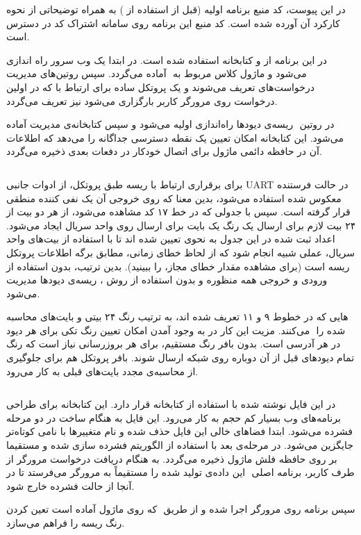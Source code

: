 
در این پیوست، کد منبع برنامه اولیه (قبل از استفاده از ) به همراه توضیحاتی از نحوه کارکرد آن آورده شده است. کد منبع این برنامه روی سامانه اشتراک کد  در دسترس است.


در این برنامه از  و کتابخانه  استفاده شده است. در ابتدا یک وب سرور راه اندازی می‌شود و ماژول کلاس مربوط به ‌ آماده می‌گردد. سپس روتین‌های مدیریت درخواست‌های  تعریف می‌شوند و یک پروتکل ساده برای ارتباط با  که در اولین درخواست روی مرورگر کاربر بارگزاری می‌شود نیز تعریف می‌گردد.

در روتین ‌ ریسه‌ی دیودها راه‌اندازی اولیه می‌شود و سپس کتابخانه‌ی مدیریت  آماده می‌شود. این کتابخانه امکان تعیین یک نقطه دسترسی جداگانه را می‌دهد که اطلاعات آن در حافظه دائمی ماژول برای اتصال خودکار در دفعات بعدی ذخیره می‌گردد.

\inputminted{C++}{espws2811/src/main.cpp}


برای برقراری ارتباط با ریسه طبق پروتکل، از ادوات جانبی UART در حالت فرستنده معکوس شده استفاده می‌شود، بدین معنا که روی خروجی آن یک نفی کننده منطقی قرار گرفته است. سپس با جدولی که در خط ۱۷ کد مشاهده می‌شود، از هر دو بیت از ۲۴ بیت لازم برای ارسال یک رنگ یک بایت برای ارسال روی واحد سریال ایجاد می‌شود. اعداد ثبت شده در این جدول به نحوی تعیین شده اند تا با استفاده از بیت‌های واحد سریال، عملی شبیه  انجام شود که از لحاظ خطای زمانی، مطابق برگه اطلاعات پروتکل ریسه است (برای مشاهده مقدار خطای مجاز،  را ببینید). بدین ترتیب، بدون استفاده از ورودی و خروجی همه منظوره و بدون استفاده از روش ، ریسه‌ی دیودها مدیریت می‌شود.

هایی
که در خطوط ۹ و ۱۱ تعریف شده اند، به ترتیب رنگ ۲۴ بیتی و بایت‌های محاسبه شده را ‌ می‌کنند. مزیت این کار در به وجود آمدن امکان تعیین رنگ تکی برای هر دیود در هر آدرسی است. بدون بافر رنگ مستقیم، برای هر بروزرسانی نیاز است که رنگ تمام دیودهای قبل از آن دوباره روی شبکه ارسال شوند. بافر پروتکل هم برای جلوگیری از محاسبه‌ی مجدد بایت‌های قبلی به کار می‌رود.

\inputminted{C}{espws2811/src/ws2811.c}


در این فایل  نوشته شده با استفاده از کتابخانه‌  قرار دارد. این کتابخانه برای طراحی برنامه‌های وب بسیار کم حجم به کار می‌رود. این فایل به هنگام ساخت  ‌در دو مرحله فشرده می‌شود. ابتدا فضاهای خالی این فایل حذف شده و نام متغییرها با نامی کوتاه‌تر جایگزین می‌شود. در مرحله‌ی بعد با استفاده از الگوریتم ‌فشرده سازی شده و مستقیما بر روی حافظه فلش ماژول ذخیره می‌گردد. به هنگام دریافت درخواست مرورگر از طرف کاربر، برنامه اصلی ‌ این داده‌ی تولید شده را مستقیماً به مرورگر می‌فرستد تا در آنجا از حالت فشرده خارج شود.

سپس برنامه روی مرورگر اجرا شده و از طریق ‌ که روی ماژول آماده است تعین کردن رنگ ریسه را فراهم می‌سازد.

\inputminted{jsx}{espws2811/web/index.jsx}

